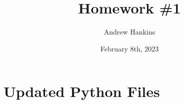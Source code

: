 \documentclass[
	12pt, %
]{fphw}
\title{Homework \#1} %
\author{Andrew Hankins} %
\date{February 8th, 2023} %
\institute{University of Alabama \\ College of Engineering} %
\begin{document}
\maketitle %



\section{Updated Python Files}

\begin{problem}
	
\end{problem}

\begin{problem}
	
\end{problem}

\begin{problem}
	
\end{problem}
\end{document}
